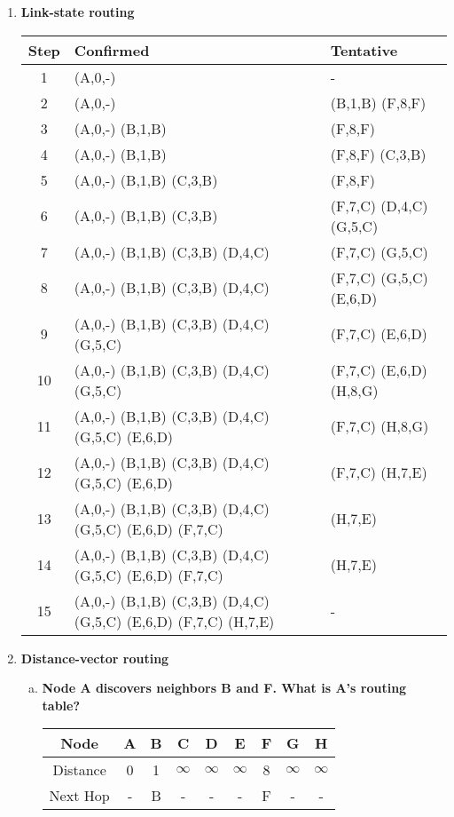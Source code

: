 \documentclass[11pt]{article}
\begin{document}
\begin{enumerate}[1.]
  \item %
  \textbf{
    Link-state routing
  } 

    \begin{tabular}{|c|l|l|}
    \hline
    Step & Confirmed & Tentative \\
    \hline
    1 & (A,0,-) & - \\
    2 & (A,0,-) & 
      (B,1,B) (F,8,F) \\
    3 & (A,0,-) (B,1,B) & 
      (F,8,F) \\
    4 & (A,0,-) (B,1,B) &
      (F,8,F) (C,3,B) \\
    5 & (A,0,-) (B,1,B) (C,3,B) & (F,8,F) \\
    6 & (A,0,-) (B,1,B) (C,3,B) & (F,7,C) (D,4,C) (G,5,C) \\
    7 & (A,0,-) (B,1,B) (C,3,B) (D,4,C) & (F,7,C) (G,5,C) \\
    8 & (A,0,-) (B,1,B) (C,3,B) (D,4,C) & (F,7,C) (G,5,C) (E,6,D) \\
    9 & (A,0,-) (B,1,B) (C,3,B) (D,4,C) (G,5,C) & (F,7,C) (E,6,D) \\ 
    10 & (A,0,-) (B,1,B) (C,3,B) (D,4,C) (G,5,C) & (F,7,C) (E,6,D) (H,8,G) \\
    11 & (A,0,-) (B,1,B) (C,3,B) (D,4,C) (G,5,C) (E,6,D) & (F,7,C) (H,8,G) \\
    12 & (A,0,-) (B,1,B) (C,3,B) (D,4,C) (G,5,C) (E,6,D) & (F,7,C) (H,7,E) \\
    13 & (A,0,-) (B,1,B) (C,3,B) (D,4,C) (G,5,C) (E,6,D) (F,7,C) & (H,7,E) \\
    14 & (A,0,-) (B,1,B) (C,3,B) (D,4,C) (G,5,C) (E,6,D) (F,7,C) & (H,7,E) \\
    15 & (A,0,-) (B,1,B) (C,3,B) (D,4,C) (G,5,C) (E,6,D) (F,7,C) (H,7,E) & - \\
    \hline
    \end{tabular}

  \item %
  \textbf{
    Distance-vector routing
  }
  \begin{enumerate}[a.]
  \item \textbf{Node A discovers neighbors B and F. What is A’s routing table? }

    \begin{tabular}{|c|c|c|c|c|c|c|c|c|}
      \hline
      Node &      A & B & C & D & E & F & G & H \\
      \hline
      Distance &  0 & 1 & $\infty$ & $\infty$ & $\infty$ & 8 & $\infty$ & $\infty$ \\
      \hline
      Next Hop &  - & B & - & - & - & F & - & - \\
      \hline
    \end{tabular}


\end{enumerate}
\end{enumerate}
\end{document}
